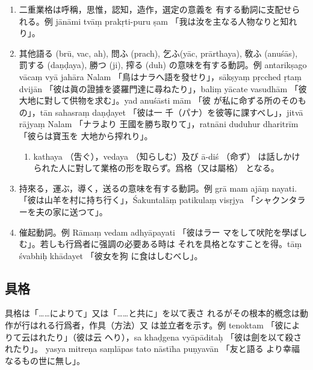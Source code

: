 \numberParagraph
\begin{enumerate}[label=(\arabic*)]
\item 二重業格は呼稱，思惟，認知，造作，選定の意義を
有する動詞に支配せられる。例 jānāmi tvāṃ prakṛti-puru\-%
ṣam 「我は汝を主なる人物なりと知れり」。
\item 其他語る (brū, vac, ah), 問ふ (prach), 乞ふ(yāc,
prārthaya), 敎ふ (anuśās), 罰する (daṇḍaya), 勝つ (ji),
搾る (duh) の意味を有する動詞。例 antarikṣago vācaṃ vyā\-%
jahāra Nalam 「鳥はナラへ語を發せり」，sākṣyaṃ pṛcched
ṛtaṃ dvijān 「彼は眞の證據を婆羅門達に尋ねたり」，baliṃ yācate
vasudhām 「彼大地に對して供物を求む」。yad anuśāsti mām 「彼
が私に命ずる所のそのもの」，tān sahasraṃ daṇḍayet 「彼は一
千（パナ）を彼等に課すべし」，jitvā rājyaṃ Nalam 「ナラより
王國を勝ち取りて」，ratnāni duduhur dharitrīm 「彼らは寶玉を
大地から搾れり」。
\begin{enumerate}[label=(\alph*)]
\item kathaya （吿ぐ），vedaya （知らしむ）及び ā-diś （命ず）
は話しかけられた人に對して業格の形を取らず。爲格（又は屬格）
となる。
\end{enumerate}
\item 持來る，運ぶ，導く，送るの意味を有する動詞。例 grā\-%
mam ajāṃ nayati. 「彼は山羊を村に持ち行く」，Śakuntalāṃ
patikulaṃ visṛjya 「シャクンタラーを夫の家に送つて」。
\item 催起動詞。例 Rāmaṃ vedam adhyāpayati 「彼はラー
マをして吠陀を學ばしむ」。若しも行爲者に强調の必要ある時は
それを具格となすことを得。tāṃ śvabhiḥ khādayet 「彼女を狗
に食はしむべし」。
\end{enumerate}

\subsection{具格}
\numberParagraph
具格は「……によりて」又は「……と共に」を以て表さ
れるがその根本的槪念は動作が行はれる行爲者，作具（方法）又
は並立者を示す。例 tenoktam 「彼によりて云はれたり」（彼は云
へり），sa khaḍgena vyāpāditaḥ 「彼は劍を以て殺されたり」。
yasya mitreṇa saṃlāpas tato nāstīha puṇyavān 「友と語る
より幸福なるもの世に無し」。

